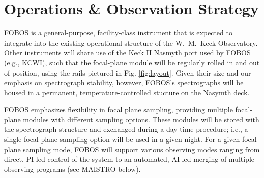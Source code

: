 \documentclass[oneside,11pt]{amsart}
\begin{document}



\section{Operations \& Observation Strategy}
\label{sec:ops}


FOBOS is a general-purpose, facility-class instrument that is
expected to integrate into the existing operational structure of the
W.~M.~Keck Observatory. Other instruments will share use of the Keck
II Nasmyth port used by FOBOS (e.g., KCWI), such that the focal-plane
module will be regularly rolled in and out of position, using the
rails pictured in Fig. \ref{fig:layout}. Given their size and our
emphasis on spectrograph stability, however, FOBOS's spectrographs
will be housed in a permanent, temperature-controlled stucture on the
Nasymth deck.

FOBOS emphasizes flexibility in focal plane sampling, providing
multiple focal-plane modules with different sampling options. These
modules will be stored with the spectrograph structure and exchanged
during a day-time procedure; i.e., a single focal-plane sampling
option will be used in a given night. For a given focal-plane
sampling mode, FOBOS will support various observing modes ranging
from direct, PI-led control of the system to an automated, AI-led
merging of multiple observing programs (see MAISTRO below).

\end{document}
